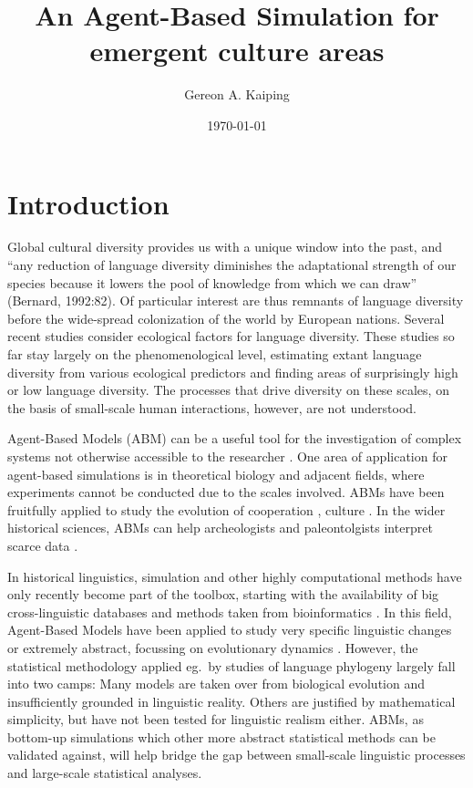 \documentclass[a4paper,12pt]{scrartcl}
\title{An Agent-Based Simulation for emergent culture areas}
\date{\today}
\author[1,2]{Gereon A. Kaiping}
\affil[1]{Geographic Information Science Center, Universität Zürich, CH}
\affil[2]{NCCR Evolving Language}
\begin{document}
\maketitle
\begin{abstract}
\end{abstract}
\tableofcontents
\section{Introduction}
Global cultural diversity provides us with a unique window into the past, and
“any reduction of language diversity diminishes the adaptational strength of our
species because it lowers the pool of knowledge from which we can draw”
(Bernard, 1992:82). %
Of particular interest are thus remnants of language diversity before the
wide-spread colonization of the world by European nations. Several recent
studies
\parencite{gavin2017processbased,pachecocoelho2019drivers,hua2019ecological}
consider ecological factors for language diversity. These studies so far stay
largely on the phenomenological level, estimating extant language diversity from
various ecological predictors and finding areas of surprisingly high or low
language diversity. The processes that drive diversity on these scales, on the
basis of small-scale human interactions, however, are not understood.

Agent-Based Models (ABM) \parencite{} can be a useful tool for the investigation
of complex systems not otherwise accessible to the researcher \parencite{}. One
area of application for agent-based simulations is in theoretical biology and
adjacent fields, where experiments cannot be conducted due to the scales
involved. ABMs have been fruitfully applied to study the evolution of
cooperation \parencite{}, culture \parencite{}. In the wider historical
sciences, ABMs can help archeologists and paleontolgists interpret scarce data
\parencite{cegielski2016rethinking,barcelo2016simulating}.

In historical linguistics, simulation and other highly computational methods
have only recently become part of the toolbox, starting with the availability of big
cross-linguistic databases and methods taken from bioinformatics
\parencite{}. In this field, Agent-Based Models have been applied to study very
specific linguistic changes
\cite{bloem2015agentbased,feltgen2017modeling,grim2011simulating,radulescu2016modelling,vantrijp2016evolution}
or extremely abstract, focussing on evolutionary dynamics
\cite{arita1998evolution,castello2013agentbased,javarone2014competitive}.
However, the statistical methodology applied eg.\ by studies of language
phylogeny largely fall into two camps: Many models are taken over from
biological evolution and insufficiently grounded in linguistic reality. Others
are justified by mathematical simplicity, but have not been tested for
linguistic realism either. ABMs, as bottom-up simulations which other more
abstract statistical methods can be validated against, will help bridge the gap
between small-scale linguistic processes and large-scale statistical analyses.
\end{document}
